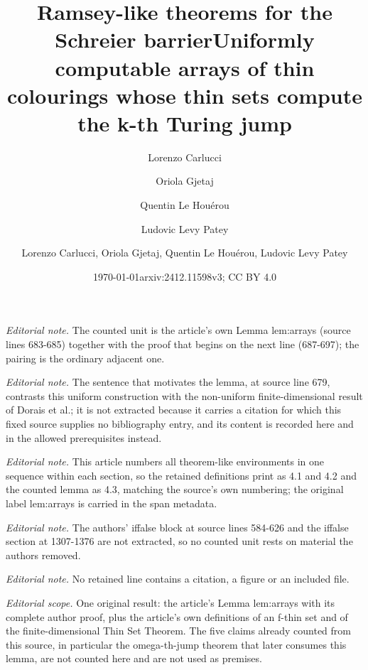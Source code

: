 \documentclass{article}
\title{Ramsey-like theorems for the Schreier barrier}
\date{\today}
\author{Lorenzo Carlucci \and Oriola Gjetaj \and Quentin Le Houérou \and Ludovic Levy Patey}
\title{Uniformly computable arrays of thin colourings whose thin sets compute the k-th Turing jump}
\author{Lorenzo Carlucci, Oriola Gjetaj, Quentin Le Houérou, Ludovic Levy Patey}
\date{arxiv:2412.11598v3; CC BY 4.0}
\numberwithin{theorem}{section}
\begin{document}
\maketitle
\setcounter{section}{4}
\setcounter{theorem}{0}
\noindent\textit{Editorial note.} The counted unit is the article's own Lemma lem:arrays (source lines 683-685) together with the proof that begins on the next line (687-697); the pairing is the ordinary adjacent one.\par\medskip
\noindent\textit{Editorial note.} The sentence that motivates the lemma, at source line 679, contrasts this uniform construction with the non-uniform finite-dimensional result of Dorais et al.; it is not extracted because it carries a citation for which this fixed source supplies no bibliography entry, and its content is recorded here and in the allowed prerequisites instead.\par\medskip
\noindent\textit{Editorial note.} This article numbers all theorem-like environments in one sequence within each section, so the retained definitions print as 4.1 and 4.2 and the counted lemma as 4.3, matching the source's own numbering; the original label lem:arrays is carried in the span metadata.\par\medskip
\noindent\textit{Editorial note.} The authors' iffalse block at source lines 584-626 and the iffalse section at 1307-1376 are not extracted, so no counted unit rests on material the authors removed.\par\medskip
\noindent\textit{Editorial note.} No retained line contains a citation, a figure or an included file.\par\medskip
\noindent\textit{Editorial scope.} One original result: the article's Lemma lem:arrays with its complete author proof, plus the article's own definitions of an f-thin set and of the finite-dimensional Thin Set Theorem. The five claims already counted from this source, in particular the omega-th-jump theorem that later consumes this lemma, are not counted here and are not used as premises.\par\medskip
\end{document}
